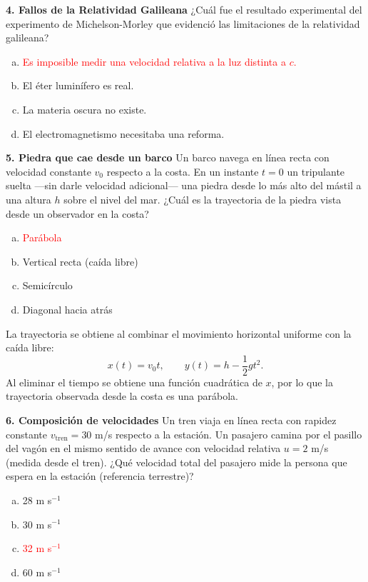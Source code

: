 \textbf{4. Fallos de la Relatividad Galileana}
¿Cuál fue el resultado experimental del experimento de Michelson-Morley que evidenció las limitaciones de la relatividad galileana?
\begin{enumerate}[a)]
    \item \textcolor{red}{Es imposible medir una velocidad relativa a la luz distinta a $c$.}
    \item El éter luminífero es real.
    \item La materia oscura no existe.
    \item El electromagnetismo necesitaba una reforma.
\end{enumerate}

\textbf{5. Piedra que cae desde un barco}
Un barco navega en línea recta con velocidad constante $v_0$ respecto a la costa. En un instante $t=0$ un tripulante suelta ---sin darle velocidad adicional--- una piedra desde lo más alto del mástil a una altura $h$ sobre el nivel del mar. ¿Cuál es la trayectoria de la piedra vista desde un observador en la costa?
\begin{enumerate}[a)]
    \item \textcolor{red}{Parábola}
    \item Vertical recta (caída libre)
    \item Semicírculo
    \item Diagonal hacia atrás
\end{enumerate}



La trayectoria se obtiene al combinar el movimiento horizontal uniforme con la caída libre:
\[
x(t)=v_0t,
\qquad
y(t)=h-\frac12gt^2.
\]
Al eliminar el tiempo se obtiene una función cuadrática de $x$, por lo que la trayectoria observada desde la costa es una parábola.

\textbf{6. Composición de velocidades}
Un tren viaja en línea recta con rapidez constante $v_{\text{tren}} = 30$ m/s respecto a la estación. Un pasajero camina por el pasillo del vagón en el mismo sentido de avance con velocidad relativa $u = 2$ m/s (medida desde el tren). ¿Qué velocidad total del pasajero mide la persona que espera en la estación (referencia terrestre)?
\begin{enumerate}[a)]
    \item 28 m s$^{-1}$
    \item 30 m s$^{-1}$
    \item \textcolor{red}{32 m s$^{-1}$}
    \item 60 m s$^{-1}$
\end{enumerate}


